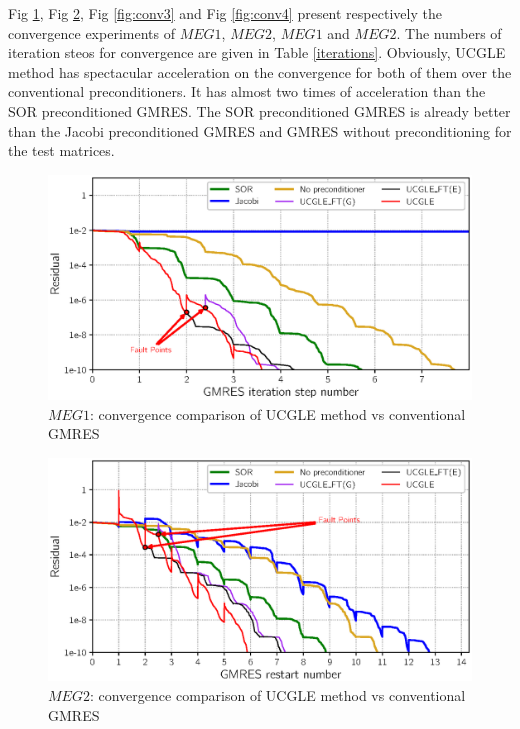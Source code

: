 Fig \ref{fig:conv1}, Fig \ref{fig:conv2}, Fig \ref{fig:conv3} and Fig \ref{fig:conv4} present respectively the convergence experiments of $MEG1$, $MEG2$, $MEG1$ and $MEG2$. The numbers of iteration steos for convergence are given in Table \ref{iterations}. Obviously, UCGLE method has spectacular acceleration on the convergence for both of them over the conventional preconditioners. It has almost two times of acceleration than the SOR preconditioned GMRES. The SOR preconditioned GMRES is already better than the Jacobi preconditioned GMRES and GMRES without preconditioning for the test matrices.

\begin{figure}[htbp]
	\centering
	\includegraphics[width=6.2in]{fig/convergence1.eps}
	\caption{$MEG1$: convergence comparison of UCGLE method vs conventional GMRES}
	\label{fig:conv1}
\end{figure}

\begin{figure}[htbp]
	\centering
	\includegraphics[width=6.2in]{fig/convergence2.eps}
	\caption{$MEG2$: convergence comparison of UCGLE method vs conventional GMRES}
	\label{fig:conv2}
\end{figure}

